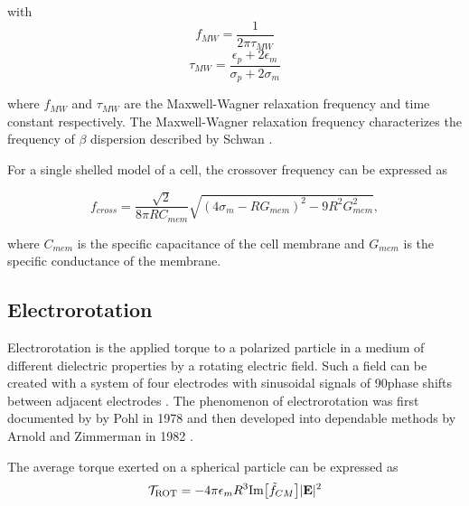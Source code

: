  \noindent with
\begin{equation}
    f_{MW} = \frac{1}{2\pi\tau_{MW}} 
\end{equation}
\begin{equation}
    \tau_{MW} = \frac{\epsilon_p + 2\epsilon_m}{\sigma_p + 2\sigma_m}
\end{equation}
 
 \noindent where $f_{MW}$ and $\tau_{MW}$ are the Maxwell-Wagner relaxation frequency and time constant respectively. The Maxwell-Wagner relaxation frequency characterizes the frequency of $\beta$ dispersion described by Schwan \cite{morgan_single_2007}.
 
 \par For a single shelled model of a cell, the crossover frequency can be expressed as
 
 \begin{equation}
     f_{cross} = \frac{\sqrt{2}}{8\pi R C_{mem}}\sqrt{(4\sigma_m - RG_{mem})^2 - 9R^2G^2_{mem}},
 \end{equation}
 
 \noindent where $C_{mem}$ is the specific capacitance of the cell membrane and $G_{mem}$ is the specific conductance of the membrane.
 
 \subsection{Electrorotation}
 
 \par Electrorotation is the applied torque to a polarized particle in a medium of different dielectric properties by a rotating electric field. Such a field can be created with a system of four electrodes with sinusoidal signals of 90\textdegree \;phase shifts between adjacent electrodes \cite{goater_electrorotation_1999}. The phenomenon of electrorotation was first documented by by Pohl in 1978 and then developed into dependable methods by Arnold and Zimmerman in 1982 \cite{pohl_dielectrophoresis_1978-1, arnold_rotating-field-induced_1982}.
 
 \par The average torque exerted on a spherical particle can be expressed as \cite{morgan_single_2007}
 \begin{equation}
    \mathcal{T}_{\text{ROT}} = -4\pi \epsilon_m R^3 \text{Im}\big[\tilde{f}_{CM}\big]|\textbf{E}|^2
    \label{eqn:ROT_torque}
 \end{equation}
 
